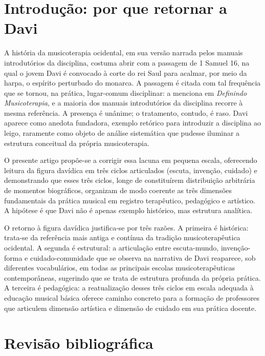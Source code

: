 \documentclass[12pt,a4paper]{article}
\begin{document}
\vspace{1em}

\section{Introdução: por que retornar a Davi}

A história da musicoterapia ocidental, em sua versão narrada pelos manuais introdutórios da disciplina, costuma abrir com a passagem de 1 Samuel 16, na qual o jovem Davi é convocado à corte do rei Saul para acalmar, por meio da harpa, o espírito perturbado do monarca. A passagem é citada com tal frequência que se tornou, na prática, lugar-comum disciplinar: \citet{Bruscia2000} a menciona em \emph{Definindo Musicoterapia}, e a maioria dos manuais introdutórios da disciplina recorre à mesma referência. A presença é unânime; o tratamento, contudo, é raso. Davi aparece como anedota fundadora, exemplo retórico para introduzir a disciplina ao leigo, raramente como objeto de análise sistemática que pudesse iluminar a estrutura conceitual da própria musicoterapia.

O presente artigo propõe-se a corrigir essa lacuna em pequena escala, oferecendo leitura da figura davídica em três ciclos articulados (escuta, invenção, cuidado) e demonstrando que esses três ciclos, longe de constituírem distribuição arbitrária de momentos biográficos, organizam de modo coerente as três dimensões fundamentais da prática musical em registro terapêutico, pedagógico e artístico. A hipótese é que Davi não é apenas exemplo histórico, mas estrutura analítica.

O retorno à figura davídica justifica-se por três razões. A primeira é histórica: trata-se da referência mais antiga e contínua da tradição musicoterapêutica ocidental. A segunda é estrutural: a articulação entre escuta-mundo, invenção-forma e cuidado-comunidade que se observa na narrativa de Davi reaparece, sob diferentes vocabulários, em todas as principais escolas musicoterapêuticas contemporâneas, sugerindo que se trata de estrutura profunda da própria prática. A terceira é pedagógica: a reatualização desses três ciclos em escala adequada à educação musical básica oferece caminho concreto para a formação de professores que articulem dimensão artística e dimensão de cuidado em sua prática docente.

\section{Revisão bibliográfica}
\end{document}

